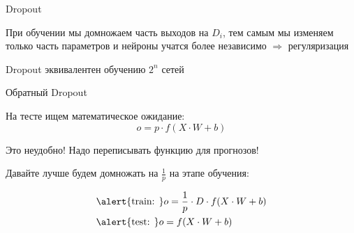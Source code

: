 \documentclass[notes,12pt, aspectratio=169]{beamer}
\newenvironment{wideitemize}{\itemize\addtolength{\itemsep}{10pt}}{\enditemize}
\begin{document}
\begin{frame}{Dropout}
\begin{wideitemize}
\item  При обучении мы домножаем часть выходов на $D_i$, тем самым мы изменяем только часть параметров и нейроны учатся более независимо  $\Rightarrow$ регуляризация

\item  Dropout эквивалентен обучению $2^n$ сетей




\end{wideitemize}
\end{frame}


\begin{frame}{Обратный Dropout}
\begin{wideitemize}
	\item   На тесте ищем математическое ожидание: 
		$$
		o = p \cdot f(X \cdot W + b)
		$$ \pause
		
	\item \alert{Это неудобно! Надо переписывать функцию для прогнозов!}  \pause
	
	\item Давайте лучше будем домножать на $\frac{1}{p}$ на этапе обучения: 
	
	\begin{equation*}
		\begin{aligned}
			& \alert{ \text{train: }}  o = \frac{1}{p} \cdot D \cdot f(X \cdot W + b) \\ 
			& \alert{\text{test:  }}   o = f(X \cdot W + b) \\
		\end{aligned}
	\end{equation*}		
\end{wideitemize}
\end{frame}
\end{document}
